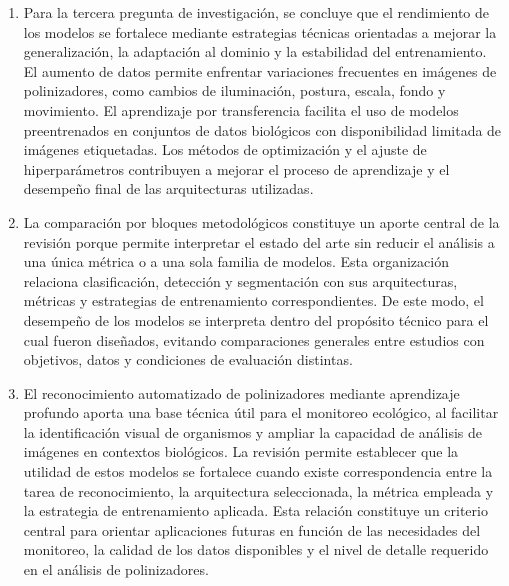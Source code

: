 \begin{enumerate}
    \item Para la tercera pregunta de investigación, se concluye que el rendimiento de los modelos se fortalece mediante estrategias técnicas orientadas a mejorar la generalización, la adaptación al dominio y la estabilidad del entrenamiento. El aumento de datos permite enfrentar variaciones frecuentes en imágenes de polinizadores, como cambios de iluminación, postura, escala, fondo y movimiento. El aprendizaje por transferencia facilita el uso de modelos preentrenados en conjuntos de datos biológicos con disponibilidad limitada de imágenes etiquetadas. Los métodos de optimización y el ajuste de hiperparámetros contribuyen a mejorar el proceso de aprendizaje y el desempeño final de las arquitecturas utilizadas. \\
    
    \item La comparación por bloques metodológicos constituye un aporte central de la revisión porque permite interpretar el estado del arte sin reducir el análisis a una única métrica o a una sola familia de modelos. Esta organización relaciona clasificación, detección y segmentación con sus arquitecturas, métricas y estrategias de entrenamiento correspondientes. De este modo, el desempeño de los modelos se interpreta dentro del propósito técnico para el cual fueron diseñados, evitando comparaciones generales entre estudios con objetivos, datos y condiciones de evaluación distintas. \\
    
    \item El reconocimiento automatizado de polinizadores mediante aprendizaje profundo aporta una base técnica útil para el monitoreo ecológico, al facilitar la identificación visual de organismos y ampliar la capacidad de análisis de imágenes en contextos biológicos. La revisión permite establecer que la utilidad de estos modelos se fortalece cuando existe correspondencia entre la tarea de reconocimiento, la arquitectura seleccionada, la métrica empleada y la estrategia de entrenamiento aplicada. Esta relación constituye un criterio central para orientar aplicaciones futuras en función de las necesidades del monitoreo, la calidad de los datos disponibles y el nivel de detalle requerido en el análisis de polinizadores.

\end{enumerate}



    

    

    

    

    

    

    


